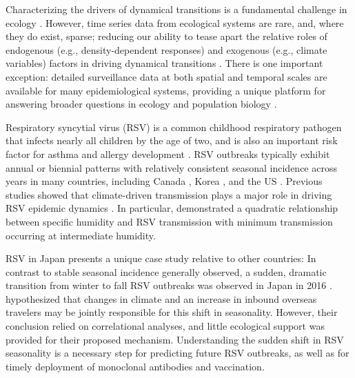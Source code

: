 \documentclass[12pt]{article}
\begin{document}
Characterizing the drivers of dynamical transitions is a fundamental challenge in ecology \citep{earn2000simple,hastings2004transients,hastings2018transient}.
However, time series data from ecological systems are rare, and, where they do exist, sparse; reducing our ability to tease apart the relative roles of endogenous (e.g., density-dependent responses) and exogenous (e.g., climate variables) factors in driving dynamical transitions \citep{hunter1998cycles,lundberg2000population,hernandez2012fluctuations}.
There is one important exception: detailed surveillance data at both spatial and temporal scales are available for many epidemiological systems, providing a unique platform for answering broader questions in ecology and population biology \citep{levin1997mathematical,anderson1991infectious,grenfell2001travelling,he2010plug}.

Respiratory syncytial virus (RSV) is a common childhood respiratory pathogen that infects nearly all children by the age of two, and is also an important risk factor for asthma and allergy development \citep{sigurs1995asthma,sigurs2010asthma,edwards2012microbiology}.
RSV outbreaks typically exhibit annual or biennial patterns with relatively consistent seasonal incidence across years in many countries, including Canada \citep{paramo2023respiratory}, Korea \citep{kim2020investigation}, and the US \citep{pitzer2015environmental,baker2019epidemic}.
Previous studies showed that climate-driven transmission plays a major role in driving RSV epidemic dynamics \citep{pitzer2015environmental,baker2019epidemic}.
In particular, \cite{baker2019epidemic} demonstrated a quadratic relationship between specific humidity and RSV transmission with minimum transmission occurring at intermediate humidity.

RSV in Japan presents a unique case study relative to other countries: In contrast to stable seasonal incidence generally observed, a sudden, dramatic transition from winter to fall RSV outbreaks was observed in Japan in 2016 \citep{miyama2021seasonal,wagatsuma2021shifts}.
\cite{wagatsuma2021shifts} hypothesized that changes in climate and an increase in inbound overseas travelers may be jointly responsible for this shift in seasonality.
However, their conclusion relied on correlational analyses, and little ecological support was provided for their proposed mechanism.
Understanding the sudden shift in RSV seasonality is a necessary step for predicting future RSV outbreaks, as well as for timely deployment of monoclonal antibodies and vaccination.
\end{document}
